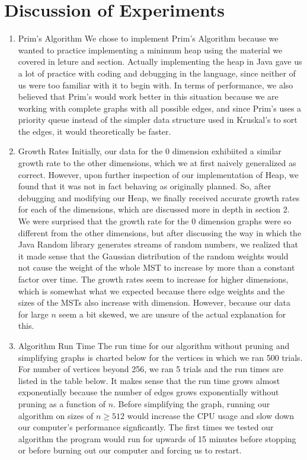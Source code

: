 \documentclass[11pt]{article}
\begin{document}
\section{Discussion of Experiments}
\begin{enumerate}
\setcounter{enumi}{0}
\item Prim's Algorithm
\newline
\newline
We chose to implement Prim's Algorithm because we wanted to practice implementing a minimum heap using the material we covered in leture and section. Actually implementing the heap in Java gave us a lot of practice with coding and debugging  in the language, since neither of us were too familiar with it to begin with. In terms of performance, we also believed that Prim's would work better in this situation because we are working with complete graphs with all possible edges, and since Prim's uses a priority queue instead of the simpler data structure used in Kruskal's to sort the edges, it would theoretically be faster.
\item Growth Rates
\newline
\newline
Initially, our data for the 0 dimension exhibiited a similar growth rate to the other dimensions, which we at first naively generalized as correct. However, upon further inspection of our implementation of Heap, we found that it was not in fact behaving as originally planned. So, after debugging and modifying our Heap, we finally received accurate growth rates for each of the dimensions, which are discussed more in depth in section 2. We were surprised that the growth rate for the 0 dimension graphs were so different from the other dimensions, but after discussing the way in which the Java Random library generates streams of random numbers, we realized that it made sense that the Gaussian distribution of the random weights would not cause the weight of the whole MST to increase by more than a constant factor over time.
\newline The growth rates seem to increase for higher dimensions, which is somewhat what we expected because there edge weights and the sizes of the MSTs also increase with dimension. However, because our data for large $n$ seem a bit skewed, we are unsure of the actual explanation for this.
\item Algorithm Run Time
\newline
\newline
The run time for our algorithm without pruning and simplifying graphs is charted below for the vertices in which we ran 500 trials. For number of vertices beyond 256, we ran 5 trials and the run times are listed in the table below. It makes sense that the run time grows almost exponentially because the number of edges grows exponentially without pruning as a function of $n$. Before simplifying the graph, running our algorithm on sizes of $n \geq 512$ would increase the CPU usage and slow down our computer's performance signficantly. The first times we tested our algorithm the program would run for upwards of 15 minutes before stopping or before burning out our computer and forcing us to restart. 

\end{enumerate}
\end{document}
